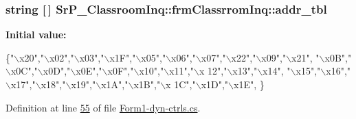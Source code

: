 \hypertarget{class_sr_p___classroom_inq_1_1frm_classrrom_inq_a0f417902be6534cb30d93b2c0d836165}{
\subsubsection[{addr\-\_\-tbl}]{\setlength{\rightskip}{0pt plus 5cm}string \mbox{[}$\,$\mbox{]} {\bf \-Sr\-P\-\_\-\-Classroom\-Inq\-::frm\-Classrrom\-Inq\-::addr\-\_\-tbl}}}
\label{class_sr_p___classroom_inq_1_1frm_classrrom_inq_a0f417902be6534cb30d93b2c0d836165}
{\bfseries \-Initial value\-:}
\begin{DoxyCode}
 \{\textcolor{stringliteral}{"\(\backslash\)x20"},\textcolor{stringliteral}{"\(\backslash\)x02"},\textcolor{stringliteral}{"\(\backslash\)x03"},\textcolor{stringliteral}{"\(\backslash\)x1F"},\textcolor{stringliteral}{"\(\backslash\)x05"},\textcolor{stringliteral}{"\(\backslash\)x06"},\textcolor{stringliteral}{"\(\backslash\)x07"},\textcolor{stringliteral}{"\(\backslash\)x22"},\textcolor{stringliteral}{"\(\backslash\)x09"},\textcolor{stringliteral}{"\(\backslash\)x21"},
                           \textcolor{stringliteral}{"\(\backslash\)x0B"},\textcolor{stringliteral}{"\(\backslash\)x0C"},\textcolor{stringliteral}{"\(\backslash\)x0D"},\textcolor{stringliteral}{"\(\backslash\)x0E"},\textcolor{stringliteral}{"\(\backslash\)x0F"},\textcolor{stringliteral}{"\(\backslash\)x10"},\textcolor{stringliteral}{"\(\backslash\)x11"},\textcolor{stringliteral}{"\(\backslash\)x
      12"},\textcolor{stringliteral}{"\(\backslash\)x13"},\textcolor{stringliteral}{"\(\backslash\)x14"},
                           \textcolor{stringliteral}{"\(\backslash\)x15"},\textcolor{stringliteral}{"\(\backslash\)x16"},\textcolor{stringliteral}{"\(\backslash\)x17"},\textcolor{stringliteral}{"\(\backslash\)x18"},\textcolor{stringliteral}{"\(\backslash\)x19"},\textcolor{stringliteral}{"\(\backslash\)x1A"},\textcolor{stringliteral}{"\(\backslash\)x1B"},\textcolor{stringliteral}{"\(\backslash\)x
      1C"},\textcolor{stringliteral}{"\(\backslash\)x1D"},\textcolor{stringliteral}{"\(\backslash\)x1E"},
                            \}
\end{DoxyCode}


\-Definition at line \hyperlink{_form1-dyn-ctrls_8cs_source_l00055}{55} of file \hyperlink{_form1-dyn-ctrls_8cs_source}{\-Form1-\/dyn-\/ctrls.\-cs}.

